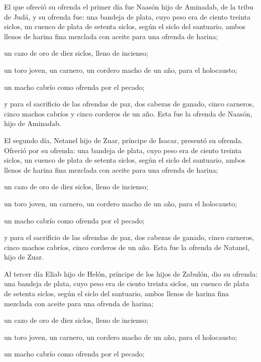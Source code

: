  El que ofreció su ofrenda el primer día fue Naasón hijo
de Aminadab, de la tribu de Judá,  y su ofrenda fue: una
bandeja de plata, cuyo peso era de ciento treinta siclos, un cuenco de
plata de setenta siclos, según el siclo del santuario, ambos llenos de
harina fina mezclada con aceite para una ofrenda de harina;

 un cazo de oro de diez siclos, lleno de incienso;

 un toro joven, un carnero, un cordero macho de un año,
para el holocausto;

 un macho cabrío como ofrenda por el pecado;

 y para el sacrificio de las ofrendas de paz, dos cabezas
de ganado, cinco carneros, cinco machos cabríos y cinco corderos de un
año. Esta fue la ofrenda de Naasón, hijo de Aminadab.

 El segundo día, Netanel hijo de Zuar, príncipe de
Isacar, presentó su ofrenda.  Ofreció por su ofrenda: una
bandeja de plata, cuyo peso era de ciento treinta siclos, un cuenco de
plata de setenta siclos, según el siclo del santuario, ambos llenos de
harina fina mezclada con aceite para una ofrenda de harina;

 un cazo de oro de diez siclos, lleno de incienso;

 un toro joven, un carnero, un cordero macho de un año,
para el holocausto;

 un macho cabrío como ofrenda por el pecado;

 y para el sacrificio de las ofrendas de paz, dos cabezas
de ganado, cinco carneros, cinco machos cabríos, cinco corderos de un
año. Esta fue la ofrenda de Natanel, hijo de Zuar.

 Al tercer día Eliab hijo de Helón, príncipe de los hijos
de Zabulón,  dio su ofrenda: una bandeja de plata, cuyo
peso era de ciento treinta siclos, un cuenco de plata de setenta siclos,
según el siclo del santuario, ambos llenos de harina fina mezclada con
aceite para una ofrenda de harina;

 un cazo de oro de diez siclos, lleno de incienso;

 un toro joven, un carnero, un cordero macho de un año,
para el holocausto;

 un macho cabrío como ofrenda por el pecado;


